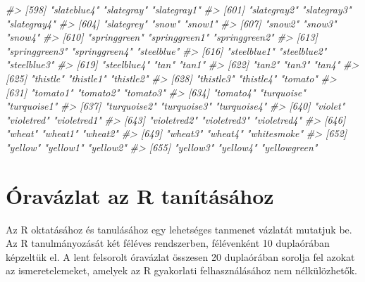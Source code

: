 \documentclass[
]{book}
\newenvironment{Shaded}{\begin{snugshade}}{\end{snugshade}}
\newcommand{\CommentTok}[1]{\textcolor[rgb]{0.56,0.35,0.01}{\textit{#1}}}
\begin{document}
\begin{Shaded}
\begin{Highlighting}[]
\CommentTok{\#\textgreater{} [598] "slateblue4"           "slategray"            "slategray1"          }
\CommentTok{\#\textgreater{} [601] "slategray2"           "slategray3"           "slategray4"          }
\CommentTok{\#\textgreater{} [604] "slategrey"            "snow"                 "snow1"               }
\CommentTok{\#\textgreater{} [607] "snow2"                "snow3"                "snow4"               }
\CommentTok{\#\textgreater{} [610] "springgreen"          "springgreen1"         "springgreen2"        }
\CommentTok{\#\textgreater{} [613] "springgreen3"         "springgreen4"         "steelblue"           }
\CommentTok{\#\textgreater{} [616] "steelblue1"           "steelblue2"           "steelblue3"          }
\CommentTok{\#\textgreater{} [619] "steelblue4"           "tan"                  "tan1"                }
\CommentTok{\#\textgreater{} [622] "tan2"                 "tan3"                 "tan4"                }
\CommentTok{\#\textgreater{} [625] "thistle"              "thistle1"             "thistle2"            }
\CommentTok{\#\textgreater{} [628] "thistle3"             "thistle4"             "tomato"              }
\CommentTok{\#\textgreater{} [631] "tomato1"              "tomato2"              "tomato3"             }
\CommentTok{\#\textgreater{} [634] "tomato4"              "turquoise"            "turquoise1"          }
\CommentTok{\#\textgreater{} [637] "turquoise2"           "turquoise3"           "turquoise4"          }
\CommentTok{\#\textgreater{} [640] "violet"               "violetred"            "violetred1"          }
\CommentTok{\#\textgreater{} [643] "violetred2"           "violetred3"           "violetred4"          }
\CommentTok{\#\textgreater{} [646] "wheat"                "wheat1"               "wheat2"              }
\CommentTok{\#\textgreater{} [649] "wheat3"               "wheat4"               "whitesmoke"          }
\CommentTok{\#\textgreater{} [652] "yellow"               "yellow1"              "yellow2"             }
\CommentTok{\#\textgreater{} [655] "yellow3"              "yellow4"              "yellowgreen"}
\end{Highlighting}
\end{Shaded}

\hypertarget{oravazlat-az-r-tanitasahoz}{%
\chapter{Óravázlat az R tanításához}\label{oravazlat-az-r-tanitasahoz}}

Az R oktatásához és tanulásához egy lehetséges tanmenet vázlatát
mutatjuk be. Az R tanulmányozását két féléves rendszerben, félévenként
10 duplaórában képzeltük el. A lent felsorolt óravázlat összesen 20
duplaórában sorolja fel azokat az ismeretelemeket, amelyek az R
gyakorlati felhasználásához nem nélkülözhetők.
\end{document}
